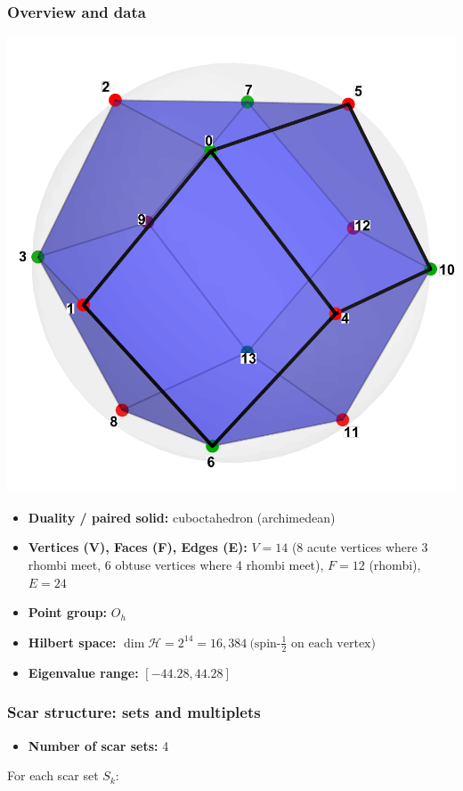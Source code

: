 \documentclass[11pt,a4paper]{article}
\begin{document}
\subsubsection*{Overview and data}
\begin{center}
  \includegraphics[width=.6\linewidth]{rhombicdodecahedron}
\end{center}

\begin{itemize}[leftmargin=1.5em]
  \item \textbf{Duality / paired solid:} cuboctahedron (archimedean)
  \item \textbf{Vertices (V), Faces (F), Edges (E):} $V = 14$ (8 acute vertices where 3 rhombi meet, 6 obtuse vertices where 4 rhombi meet),\; $F = 12$ (rhombi),\; $E = 24$
  \item \textbf{Point group:} $O_h$
  \item \textbf{Hilbert space:} \(
        \dim\mathcal{H} = 2^{14} = 16,384\ \text{(spin-$\tfrac12$ on each vertex)}
        \)
  \item \textbf{Eigenvalue range:} $[-44.28, 44.28]$
\end{itemize}

\subsubsection*{Scar structure: sets and multiplets}

\begin{itemize}[leftmargin=1.5em]
  \item \textbf{Number of scar sets:} 4
  \end{itemize}
  \hspace{6mm}For each scar set $S_k$:\\
\end{document}
